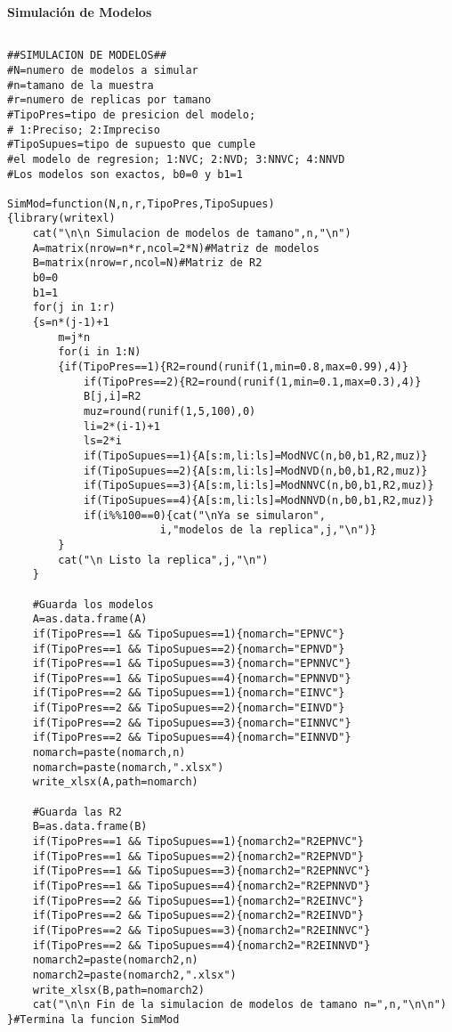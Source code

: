 \textbf{Simulación de Modelos}
\begin{verbatim}

##SIMULACION DE MODELOS##
#N=numero de modelos a simular
#n=tamano de la muestra
#r=numero de replicas por tamano
#TipoPres=tipo de presicion del modelo;
# 1:Preciso; 2:Impreciso
#TipoSupues=tipo de supuesto que cumple 
#el modelo de regresion; 1:NVC; 2:NVD; 3:NNVC; 4:NNVD
#Los modelos son exactos, b0=0 y b1=1

SimMod=function(N,n,r,TipoPres,TipoSupues)
{library(writexl)
	cat("\n\n Simulacion de modelos de tamano",n,"\n")
	A=matrix(nrow=n*r,ncol=2*N)#Matriz de modelos
	B=matrix(nrow=r,ncol=N)#Matriz de R2
	b0=0
	b1=1
	for(j in 1:r)
	{s=n*(j-1)+1
		m=j*n
		for(i in 1:N)
		{if(TipoPres==1){R2=round(runif(1,min=0.8,max=0.99),4)}
			if(TipoPres==2){R2=round(runif(1,min=0.1,max=0.3),4)}
			B[j,i]=R2
			muz=round(runif(1,5,100),0)
			li=2*(i-1)+1
			ls=2*i
			if(TipoSupues==1){A[s:m,li:ls]=ModNVC(n,b0,b1,R2,muz)}
			if(TipoSupues==2){A[s:m,li:ls]=ModNVD(n,b0,b1,R2,muz)}
			if(TipoSupues==3){A[s:m,li:ls]=ModNNVC(n,b0,b1,R2,muz)}
			if(TipoSupues==4){A[s:m,li:ls]=ModNNVD(n,b0,b1,R2,muz)}
			if(i%%100==0){cat("\nYa se simularon",
						i,"modelos de la replica",j,"\n")}
		}
		cat("\n Listo la replica",j,"\n")
	}
	
	#Guarda los modelos
	A=as.data.frame(A)
	if(TipoPres==1 && TipoSupues==1){nomarch="EPNVC"}
	if(TipoPres==1 && TipoSupues==2){nomarch="EPNVD"}
	if(TipoPres==1 && TipoSupues==3){nomarch="EPNNVC"}
	if(TipoPres==1 && TipoSupues==4){nomarch="EPNNVD"}
	if(TipoPres==2 && TipoSupues==1){nomarch="EINVC"}
	if(TipoPres==2 && TipoSupues==2){nomarch="EINVD"}
	if(TipoPres==2 && TipoSupues==3){nomarch="EINNVC"}
	if(TipoPres==2 && TipoSupues==4){nomarch="EINNVD"}
	nomarch=paste(nomarch,n)
	nomarch=paste(nomarch,".xlsx")
	write_xlsx(A,path=nomarch)
	
	#Guarda las R2
	B=as.data.frame(B)
	if(TipoPres==1 && TipoSupues==1){nomarch2="R2EPNVC"}
	if(TipoPres==1 && TipoSupues==2){nomarch2="R2EPNVD"}
	if(TipoPres==1 && TipoSupues==3){nomarch2="R2EPNNVC"}
	if(TipoPres==1 && TipoSupues==4){nomarch2="R2EPNNVD"}
	if(TipoPres==2 && TipoSupues==1){nomarch2="R2EINVC"}
	if(TipoPres==2 && TipoSupues==2){nomarch2="R2EINVD"}
	if(TipoPres==2 && TipoSupues==3){nomarch2="R2EINNVC"}
	if(TipoPres==2 && TipoSupues==4){nomarch2="R2EINNVD"}
	nomarch2=paste(nomarch2,n)
	nomarch2=paste(nomarch2,".xlsx")
	write_xlsx(B,path=nomarch2)
	cat("\n\n Fin de la simulacion de modelos de tamano n=",n,"\n\n")
}#Termina la funcion SimMod
\end{verbatim}



